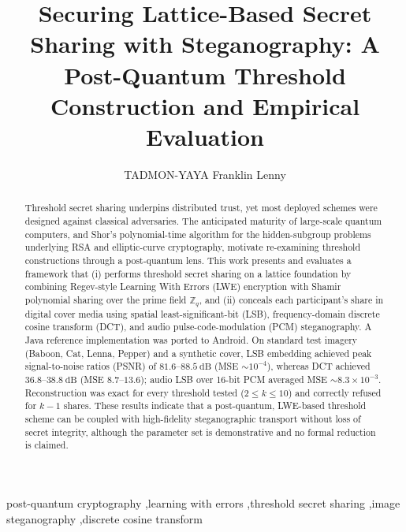 \documentclass[preprint,12pt,number]{elsarticle}
\begin{document}
\begin{frontmatter}

\title{Securing Lattice-Based Secret Sharing with Steganography: A Post-Quantum Threshold Construction
and Empirical Evaluation}

\author[inst1]{TADMON-YAYA Franklin Lenny}

\begin{abstract}
Threshold secret sharing underpins distributed trust, yet most deployed
schemes were designed against classical adversaries. The anticipated maturity
of large-scale quantum computers, and Shor's polynomial-time algorithm for the
hidden-subgroup problems underlying RSA and elliptic-curve cryptography,
motivate re-examining threshold constructions through a post-quantum lens.
This work presents and evaluates a framework that (i) performs threshold secret
sharing on a lattice foundation by combining Regev-style Learning With Errors
(LWE) encryption with Shamir polynomial sharing over the prime field
$\mathbb{Z}_q$, and (ii) conceals each participant's share in digital cover
media using spatial least-significant-bit (LSB), frequency-domain discrete
cosine transform (DCT), and audio pulse-code-modulation (PCM) steganography. A
Java reference implementation was ported to Android. On standard test imagery
(Baboon, Cat, Lenna, Pepper) and a synthetic cover, LSB embedding achieved peak
signal-to-noise ratios (PSNR) of $81.6$--$88.5~\mathrm{dB}$ (MSE
$\sim\!10^{-4}$), whereas DCT achieved $36.8$--$38.8~\mathrm{dB}$ (MSE
$8.7$--$13.6$); audio LSB over 16-bit PCM averaged MSE
$\sim\!8.3\times10^{-3}$. Reconstruction was exact for every threshold tested
($2 \le k \le 10$) and correctly refused for $k-1$ shares. These results
indicate that a post-quantum, LWE-based threshold scheme can be coupled with
high-fidelity steganographic transport without loss of secret integrity,
although the parameter set is demonstrative and no formal reduction is claimed.
\end{abstract}

\begin{keyword}
post-quantum cryptography \sep learning with errors \sep threshold secret
sharing \sep image steganography \sep discrete cosine transform
\end{keyword}

\end{frontmatter}
\end{document}
